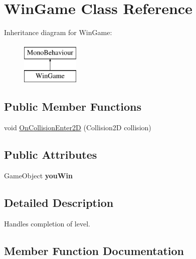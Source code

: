 \hypertarget{class_win_game}{}\section{Win\+Game Class Reference}
\label{class_win_game}
Inheritance diagram for Win\+Game\+:\begin{figure}[H]
\begin{center}
\leavevmode
\includegraphics[height=2.000000cm]{class_win_game}
\end{center}
\end{figure}
\subsection*{Public Member Functions}
\begin{DoxyCompactItemize}
\item 
void \mbox{\hyperlink{class_win_game_a20f3871fd050c6da54d041b49a7fb063}{On\+Collision\+Enter2D}} (Collision2D collision)
\end{DoxyCompactItemize}
\subsection*{Public Attributes}
\begin{DoxyCompactItemize}
\item 
\mbox{\label{class_win_game_a47aaa13484e5df8fc2dc9cca90a3e78f}} 
Game\+Object {\bfseries you\+Win}
\end{DoxyCompactItemize}


\subsection{Detailed Description}
Handles completion of level. 

\subsection{Member Function Documentation}
\mbox{\label{class_win_game_a20f3871fd050c6da54d041b49a7fb063}} 
